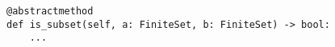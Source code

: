 \par\begin{minipage}{60ex}
\begin{verbatim}
@abstractmethod
def is_subset(self, a: FiniteSet, b: FiniteSet) -> bool:
    ...
\end{verbatim}
\end{minipage}\par